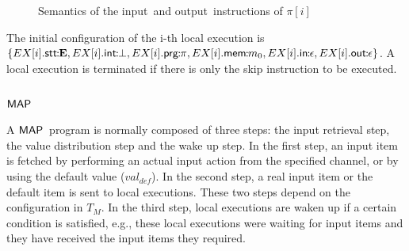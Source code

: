 \documentclass[10pt,a4paper,oneside]{article}
\def\dequeue#1#2{\ensuremath{dequeue(#1, #2)}}
\def\constructV#1#2{\ensuremath{\ouvd[#2\mapsto#1]}}
\def\substitute#1#2#3{\ensuremath{#1[#2\mapsto#3]}}
\def\intsig#1{\ensuremath{#1}}
\def\st{\ensuremath{st}}
\def\sE{\textbf{E}}
\def\sS{\textbf{S}}
\def\TAV{\ensuremath{T_{M}}}
\def\ST{{\ensuremath{EX}}}
\def\ouvd{\ensuremath{\vec{\bot}}}
\def\chnl{\ensuremath{c}}
\def\NIL{\ensuremath{\bot}}
\def\ACCORCIA{\vspace*{-\baselineskip}}
\def\lcomma{\ensuremath{\!\!:\!\!}}
\def\lecconf#1#2#3{\ensuremath{\ST[#1].#2\lcomma#3}}
\def\sanserif#1{\ensuremath{\sf #1}}
\def\MAP{\ensuremath{\sanserif{MAP}}}
\def\defVal{\ensuremath{val_{def}}}
\def\valueM{\ensuremath{val}}
\def\emptyQ{\ensuremath{\epsilon}}
\def\Prog{\ensuremath{\pi}}
\def\Progl#1{\ensuremath{\Prog[#1]}}
\def\comm{\ensuremath{\pi}}
\def\Iid{\ensuremath{I}}
\def\Oid{\ensuremath{O}}
\def\LabelRule#1#2#3{\ensuremath{{\inferrule*[Left={#1}]{#2}{#3}}}}
\def\RINPUTYL{LINP1}
\def\RINPUTNL{LINP2}
\def\ROUTPUTL{LOUTP}
\def\NINPUT{input}
\def\NOUTPUT{output}
\def\lprog{{\sf prg}}
\def\lmem{{\sf mem}}
\def\lmemi{{\sf \ensuremath{mem}}}
\def\linputi{{\sf in}}
\def\loutputi{{\sf out}}
\def\litr{{\sf int}}
\def\lstate{{\sf stt}}
\begin{document}
\begin{figure}[!t]
\begin{center}
\ACCORCIA
{}
\ACCORCIA
\caption{Semantics of the \NINPUT\ and \NOUTPUT\ instructions of \Progl{i}}
    \label{fig:LocCommandSem2}
\end{center}
\end{figure}

The initial configuration of the i-th local execution is $\{ \lecconf{i}{\lstate}{\sE},\lecconf{i}{\litr}{\NIL}, \lecconf{i}{\lprog}{\comm}, \lecconf{i}{\lmem}{m_0}, \lecconf{i}{\linputi}{\emptyQ}, \lecconf{i}{\loutputi}{\emptyQ}\}$.
A local execution is terminated if there is only the skip instruction to be executed.

\subsection{\MAP}
A \MAP\ program is normally composed of three steps: the input retrieval step, the value distribution step and the wake up step. In the first step, an input item is fetched by performing an actual input action from the specified channel, or by using the default value (\defVal). In the second step, a real input item or the default item is sent to local executions. These two steps depend on the configuration in \TAV. In the third step, local executions are waken up if a certain condition is satisfied, e.g., these local executions were waiting for input items and they have received the input items they required.
\end{document}
